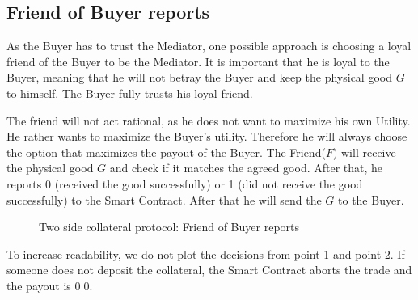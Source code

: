 \documentclass{cacthesis}
\begin{document}
\subsection{Friend of Buyer reports}
As the Buyer has to trust the Mediator, one possible approach is choosing a loyal friend of the Buyer to be the Mediator. It is important that he is loyal to the Buyer, meaning that he will not betray the Buyer and keep the physical good $G$ to himself. The Buyer fully trusts his loyal friend.\newline

The friend will not act rational, as he does not want to maximize his own Utility. He rather wants to maximize the Buyer's utility. Therefore he will always choose the option that maximizes the payout of the Buyer.
The Friend($F$) will receive the physical good $G$ and check if it matches the agreed good. After that, he reports 0 (received the good successfully) or 1 (did not receive the good successfully) to the Smart Contract. After that he will send the $G$ to the Buyer.\newpage

\begin{figure}[htb!]
    \centering
    \caption{Two side collateral protocol: Friend of Buyer reports}
    \label{pro:two-side-collateral-friend}
\end{figure}

To increase readability, we do not plot the decisions from point 1 and point 2.
If someone does not deposit the collateral, the Smart Contract aborts the trade
and the payout is $0|0$.\newline
\end{document}
